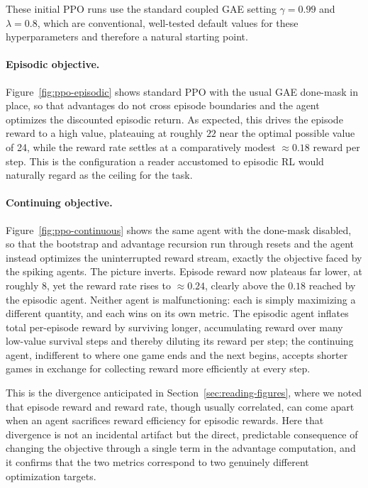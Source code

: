 These initial PPO runs use the standard coupled GAE
setting $\gamma=0.99$ and $\lambda=0.8$, which are conventional, well-tested
default values for these hyperparameters and therefore a natural starting point.

\paragraph{Episodic objective.} Figure~\ref{fig:ppo-episodic} shows standard
PPO with the usual GAE done-mask in place, so that advantages do not cross
episode boundaries and the agent optimizes the discounted episodic return. As
expected, this drives the episode reward to a high value, plateauing at
roughly $22$ near the optimal possible value of 24, while the reward rate settles at a comparatively modest
$\approx 0.18$ reward per step. This is the configuration a reader accustomed
to episodic RL would naturally regard as the ceiling for the task.

\paragraph{Continuing objective.} Figure~\ref{fig:ppo-continuous} shows the
same agent with the done-mask disabled, so that the bootstrap and advantage
recursion run through resets and the agent instead optimizes the
uninterrupted reward stream, exactly the objective faced by the spiking
agents. The picture inverts. Episode reward now plateaus far lower, at roughly
$8$, yet the reward rate rises to $\approx 0.24$, clearly above the $0.18$
reached by the episodic agent. Neither agent is malfunctioning: each is simply
maximizing a different quantity, and each wins on its own metric. The episodic
agent inflates total per-episode reward by surviving longer, accumulating
reward over many low-value survival steps and thereby diluting its reward per
step; the continuing agent, indifferent to where one game ends and the next
begins, accepts shorter games in exchange for collecting reward more
efficiently at every step.

This is the divergence anticipated in
Section~\ref{sec:reading-figures}, where we noted that episode reward and
reward rate, though usually correlated, can come apart when an agent sacrifices reward efficiency for episodic rewards. Here that divergence is not an incidental artifact but the
direct, predictable consequence of changing the objective through a single
term in the advantage computation, and it confirms that the two metrics
correspond to two genuinely different optimization targets.

